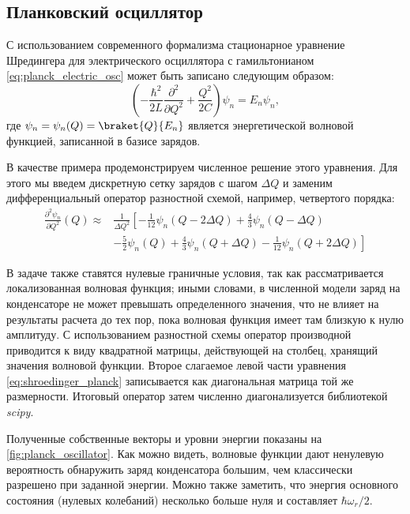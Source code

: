 \documentclass[14pt, a4paper]{extreport}
\numberwithin{equation}{section}
\begin{document}
\subsection{Планковский осциллятор}

С использованием современного формализма стационарное уравнение Шредингера для электрического осциллятора с гамильтонианом \eqref{eq:planck_electric_osc} может быть записано следующим образом:
\begin{equation}
	\left(-\frac{\hbar^2}{2 L} \frac{\partial^2 }{\partial Q^2} + \frac{Q^2}{2 C}\right)\psi_n = E_n \psi_n,\label{eq:shroedinger_planck}
\end{equation}
где $\psi_n = \psi_n(Q) = \braket{Q}{E_n}$ является энергетической волновой функцией, записанной в базисе зарядов. 

В качестве примера продемонстрируем численное решение этого уравнения. Для этого мы введем дискретную сетку зарядов с шагом $\Delta Q$ и заменим дифференциальный оператор разностной схемой, например, четвертого порядка:
\begin{equation}
\begin{aligned}
	\frac{\partial^2 \psi_n}{\partial Q^2}(Q) \approx &\frac{1}{\Delta Q^2}\left[-\frac{1}{12} \psi_n(Q - 2 \Delta Q)
+\frac{4}{3} \psi_n(Q - \Delta Q)\right.\\
&\left.-\frac{5}{2} \psi_n(Q)
+\frac{4}{3} \psi_n(Q + \Delta Q)
-\frac{1}{12} \psi_n(Q + 2 \Delta Q)\right]
\end{aligned}
\end{equation}

В задаче также ставятся нулевые граничные условия, так как рассматривается локализованная волновая функция; иными словами, в численной модели заряд на конденсаторе не может превышать определенного значения, что не влияет на результаты расчета до тех пор, пока волновая функция имеет там близкую к нулю амплитуду. С использованием разностной схемы оператор производной приводится к виду квадратной матрицы, действующей на столбец, хранящий значения волновой функции. Второе слагаемое левой части уравнения \eqref{eq:shroedinger_planck} записывается как диагональная матрица той же размерности. Итоговый оператор затем численно диагонализуется библиотекой \textit{scipy}.

Полученные собственные векторы и уровни энергии показаны на \autoref{fig:planck_oscillator}. Как можно видеть, волновые функции дают ненулевую вероятность обнаружить заряд конденсатора большим, чем классически разрешено при заданной энергии. Можно также заметить, что энергия основного состояния (нулевых колебаний) несколько больше нуля и составляет $\hbar \omega_r/2$.
\end{document}
